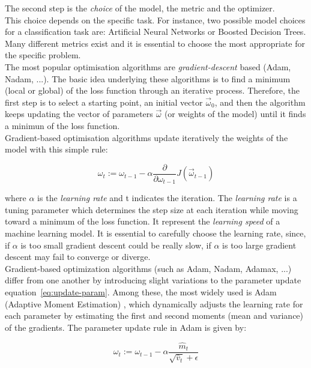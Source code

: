 The second step is the \textit{choice} of the model, the metric and the optimizer.\\
This choice depends on the specific task.
For instance, two possible model choices for a classification task are: Artificial Neural Networks or Boosted Decision Trees.\\
Many different metrics exist and it is essential to choose the most appropriate for the specific problem.\\
The most popular optimisation algorithms are \textit{gradient-descent} based (Adam, Nadam, ...).
The basic idea underlying these algorithms is to find a minimum (local or global) of the loss function through an iterative process.
Therefore, the first step is to select a starting point, an initial vector $\vec{\omega}_0$, and then the algorithm keeps updating the vector of 
parameters $\vec{\omega}$ (or weights of the model) until it finds a minimun of the loss function.\\
Gradient-based optimisation algorithms update iteratively the weights of the model with this simple rule:

\begin{equation}
\omega_{t} := \omega_{t-1} - \alpha \frac{\partial}{\partial \omega_{t-1}} J(\vec{\omega}_{t-1})
\label{eq:update-param}
\end{equation}

where $\alpha$ is the \textit{learning rate} and t indicates the iteration.
The \textit{learning rate} is a tuning parameter which determines the step size at each iteration while moving toward a minimum of the loss function.
It represent the \textit{learning speed} of a machine learning model.
It is essential to carefully choose the learning rate, since, if $\alpha$ is too small gradient descent could be really slow, if $\alpha$ is 
too large gradient descent may fail to converge or diverge. \\
Gradient-based optimization algorithms (such as Adam, Nadam, Adamax, ...) differ from one another by introducing slight variations to the parameter 
update equation~\ref{eq:update-param}.
Among these, the most widely used is Adam (Adaptive Moment Estimation) \cite{kingma2017}, which dynamically adjusts 
the learning rate for each parameter by estimating the first and second moments (mean and variance) 
of the gradients. The parameter update rule in Adam is given by:

\begin{equation}
    \omega_{t} := \omega_{t-1} - \alpha \frac{\hat{m}_t}{\sqrt{\hat{v}_t} + \epsilon} 
\end{equation}

